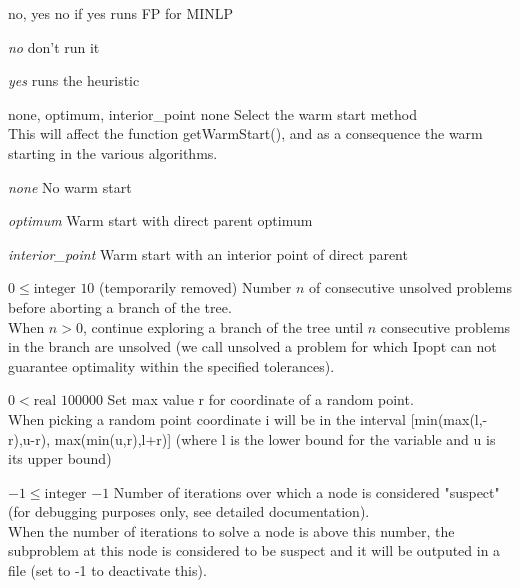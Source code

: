 %
{no, yes}%
{no}%
{if yes runs FP for MINLP}%
{\begin{list}{}{
\setlength{\parsep}{0em}
\setlength{\leftmargin}{3ex}
\setlength{\labelwidth}{1ex}
\setlength{\itemindent}{0ex}
\setlength{\topsep}{0pt}}
\item[\textit{no}] don't run it
\item[\textit{yes}] runs the heuristic
\end{list}
}

%
{none, optimum, interior\_point}%
{none}%
{Select the warm start method\\
This will affect the function getWarmStart(), and as a consequence the warm starting in the various algorithms.}%
{\begin{list}{}{
\setlength{\parsep}{0em}
\setlength{\leftmargin}{3ex}
\setlength{\labelwidth}{1ex}
\setlength{\itemindent}{0ex}
\setlength{\topsep}{0pt}}
\item[\textit{none}] No warm start
\item[\textit{optimum}] Warm start with direct parent optimum
\item[\textit{interior\_point}] Warm start with an interior point of direct parent
\end{list}
}

%
{$0\leq\textrm{integer}$}%
{$10$}%
{(temporarily removed) Number $n$ of consecutive unsolved problems before aborting a branch of the tree.\\
When $n > 0$, continue exploring a branch of the tree until $n$ consecutive problems in the branch are unsolved (we call unsolved a problem for which Ipopt can not guarantee optimality within the specified tolerances).}%
{}

%
{$0<\textrm{real}$}%
{$100000$}%
{Set max value r for coordinate of a random point.\\
When picking a random point coordinate i will be in the interval [min(max(l,-r),u-r), max(min(u,r),l+r)] (where l is the lower bound for the variable and u is its upper bound)}%
{}

%
{$-1\leq\textrm{integer}$}%
{$-1$}%
{Number of iterations over which a node is considered "suspect" (for debugging purposes only, see detailed documentation).\\
When the number of iterations to solve a node is above this number, the subproblem at this node is considered to be suspect and it will be outputed in a file (set to -1 to deactivate this).}%
{}

